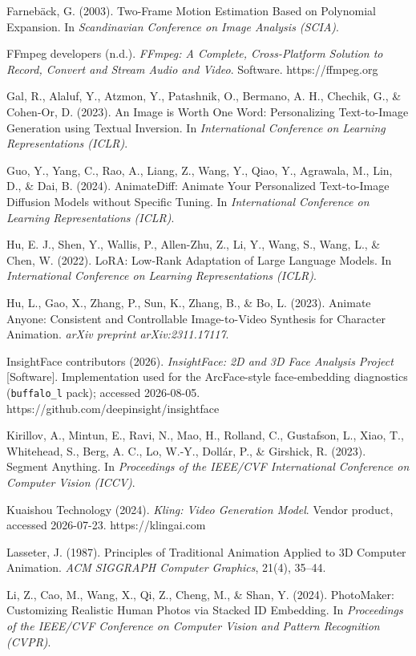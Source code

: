 \documentclass[10pt,twocolumn,letterpaper]{article}
\begin{document}
Farneb\"ack, G. (2003). Two-Frame Motion Estimation Based on Polynomial Expansion. In \emph{Scandinavian Conference on Image Analysis (SCIA)}.

FFmpeg developers (n.d.). \emph{FFmpeg: A Complete, Cross-Platform Solution to Record, Convert and Stream Audio and Video}. Software. https://ffmpeg.org

Gal, R., Alaluf, Y., Atzmon, Y., Patashnik, O., Bermano, A. H., Chechik, G., \& Cohen-Or, D. (2023). An Image is Worth One Word: Personalizing Text-to-Image Generation using Textual Inversion. In \emph{International Conference on Learning Representations (ICLR)}.

Guo, Y., Yang, C., Rao, A., Liang, Z., Wang, Y., Qiao, Y., Agrawala, M., Lin, D., \& Dai, B. (2024). AnimateDiff: Animate Your Personalized Text-to-Image Diffusion Models without Specific Tuning. In \emph{International Conference on Learning Representations (ICLR)}.

Hu, E. J., Shen, Y., Wallis, P., Allen-Zhu, Z., Li, Y., Wang, S., Wang, L., \& Chen, W. (2022). LoRA: Low-Rank Adaptation of Large Language Models. In \emph{International Conference on Learning Representations (ICLR)}.

Hu, L., Gao, X., Zhang, P., Sun, K., Zhang, B., \& Bo, L. (2023). Animate Anyone: Consistent and Controllable Image-to-Video Synthesis for Character Animation. \emph{arXiv preprint arXiv:2311.17117}.

InsightFace contributors (2026). \emph{InsightFace: 2D and 3D Face Analysis Project} [Software]. Implementation used for the ArcFace-style face-embedding diagnostics (\texttt{buffalo\_l} pack); accessed 2026-08-05. https://github.com/deepinsight/insightface

Kirillov, A., Mintun, E., Ravi, N., Mao, H., Rolland, C., Gustafson, L., Xiao, T., Whitehead, S., Berg, A. C., Lo, W.-Y., Doll\'ar, P., \& Girshick, R. (2023). Segment Anything. In \emph{Proceedings of the IEEE/CVF International Conference on Computer Vision (ICCV)}.

Kuaishou Technology (2024). \emph{Kling: Video Generation Model}. Vendor product, accessed 2026-07-23. https://klingai.com

Lasseter, J. (1987). Principles of Traditional Animation Applied to 3D Computer Animation. \emph{ACM SIGGRAPH Computer Graphics}, 21(4), 35--44.

Li, Z., Cao, M., Wang, X., Qi, Z., Cheng, M., \& Shan, Y. (2024). PhotoMaker: Customizing Realistic Human Photos via Stacked ID Embedding. In \emph{Proceedings of the IEEE/CVF Conference on Computer Vision and Pattern Recognition (CVPR)}.
\end{document}
